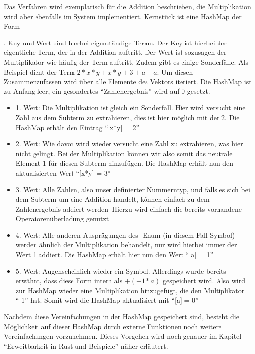 \documentclass[11pt,a4paper, ngerman]{article}
\begin{document}
Das Verfahren wird exemplarisch für die Addition beschrieben, die Multiplikation wird aber ebenfalls im System implementiert. Kernstück ist eine HashMap der Form

. Key und Wert sind hierbei eigenständige Terme. Der Key ist hierbei der eigentliche Term, der in der Addition auftritt. Der Wert ist sozusagen der Multiplikator wie häufig der Term auftritt. Zudem gibt es einige Sonderfälle. Als Beispiel dient der Term 
$2*x*y + x*y + 3 + a - a$. Um diesen Zusammenzufassen wird über alle Elemente des Vektors iteriert. Die HashMap ist zu Anfang leer, ein gesondertes ``Zahlenergebnis'' wird auf 0 gesetzt.

\begin{itemize}
    \item 1. Wert: Die Multiplikation ist gleich ein Sonderfall. Hier wird versucht eine Zahl aus dem Subterm zu extrahieren, dies ist hier möglich mit der $2$. Die HashMap erhält den Eintrag ``[x*y] = 2''
    \item 2. Wert: Wie davor wird wieder versucht eine Zahl zu extrahieren, was hier nicht gelingt. Bei der Multiplikation können wir also somit das neutrale Element 1 für diesen Subterm hinzufügen. Die HashMap erhält nun den aktualisierten Wert ``[x*y] = 3''
    \item 3. Wert: Alle Zahlen, also unser definierter Nummerntyp, und falls es sich bei dem Subterm um eine Addition handelt, können einfach zu dem Zahlenergebnis addiert werden. Hierzu wird einfach die bereits vorhandene Operatorenüberladung genutzt
    \item 4. Wert: Alle anderen Ausprägungen des -Enum (in diesem Fall Symbol) werden ähnlich der Multiplikation behandelt, nur wird hierbei immer der Wert 1 addiert. Die HashMap erhält hier nun den Wert ``[a] = 1''
    \item 5. Wert: Augenscheinlich wieder ein Symbol. Allerdings wurde bereits erwähnt, dass diese Form intern als $+(-1*a)$ gespeichert wird. Also wird zur HashMap wieder eine Multiplikation hinzugefügt, die den Multiplikator ``-1'' hat. Somit wird die HashMap aktualisiert mit ``[a] = 0''
\end{itemize}

Nachdem diese Vereinfachungen in der HashMap gespeichert sind, besteht die Möglichkeit auf dieser HashMap durch externe Funktionen noch weitere Vereinfachungen vorzunehmen. Dieses Vorgehen wird noch genauer im Kapitel ``Erweitbarkeit in Rust und Beispiele'' näher erläutert.
\end{document}
